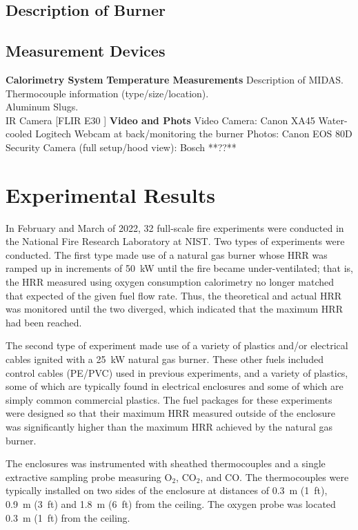 \documentclass[12pt]{article}
\begin{document}
\FloatBarrier

\subsection{Description of Burner}

\subsection{Measurement Devices}
\textbf{Calorimetry System}
\textbf{Temperature Measurements}
Description of MIDAS. \\
Thermocouple information (type/size/location).\\
Aluminum Slugs.\\
IR Camera [FLIR E30 ]
\textbf{Video and Phots}
Video Camera: Canon XA45
Water-cooled Logitech Webcam at back/monitoring the burner
Photos: Canon EOS 80D
Security Camera (full setup/hood view): Bosch **??**

\section{Experimental Results}

In February and March of 2022, 32 full-scale fire experiments were conducted in the National Fire Research Laboratory at NIST. Two types of experiments were conducted. The first type made use of a natural gas burner whose HRR was ramped up in increments of 50~kW until the fire became under-ventilated; that is, the HRR measured using oxygen consumption calorimetry no longer matched that expected of the given fuel flow rate. Thus, the theoretical and actual HRR was monitored until the two diverged, which indicated that the maximum HRR had been reached.

The second type of experiment made use of a variety of plastics and/or electrical cables ignited with a 25~kW natural gas burner. These other fuels included control cables (PE/PVC) used in previous experiments, and a variety of plastics, some of which are typically found in electrical enclosures and some of which are simply common commercial plastics. The fuel packages for these experiments were designed so that their maximum HRR measured outside of the enclosure was significantly higher than the maximum HRR achieved by the natural gas burner.

The enclosures was instrumented with sheathed thermocouples and a single extractive sampling probe measuring O$_2$, CO$_2$, and CO. The thermocouples were typically installed on two sides of the enclosure at distances of 0.3~m (1~ft), 0.9~m (3~ft) and 1.8~m (6~ft) from the ceiling. The oxygen probe was located 0.3~m (1~ft) from the ceiling.
\end{document}
